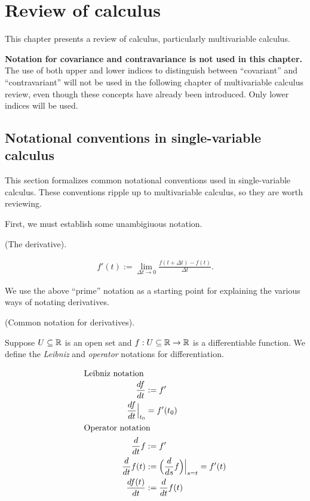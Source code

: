 \chapter{Review of calculus}
\label{ch::calc}

This chapter presents a review of calculus, particularly multivariable calculus.

\vspace{.5cm}

\textbf{Notation for covariance and contravariance is not used in this chapter.} The use of both upper and lower indices to distinguish between ``covariant'' and ``contravariant'' will not be used in the following chapter of multivariable calculus review, even though these concepts have already been introduced. Only lower indices will be used.

\section{Notational conventions in single-variable calculus}

This section formalizes common notational conventions used in single-variable calculus. These conventions ripple up to multivariable calculus, so they are worth reviewing.

First, we must establish some unambigiuous notation.

\begin{defn}
    (The derivative).
    
    \begin{align*}
        f'(t) := \lim_{\Delta t \rightarrow 0} \frac{f(t + \Delta t) - f(t)}{\Delta t}.
    \end{align*}
\end{defn}

We use the above ``prime'' notation as a starting point for explaining the various ways of notating derivatives.

\begin{defn}
\label{ch::calc::defn::common_deriv_notation}

    (Common notation for derivatives).
    
    Suppose $U \subseteq \mathbb{R}$ is an open set and $f:U \subseteq \mathbb{R} \rightarrow \mathbb{R}$ is a differentiable function. We define the \textit{Leibniz} and \textit{operator} notations for differentiation.
    
    \begin{center}
        \begin{align*}
            \intertext{Leibniz notation} \hspace{2cm}
            \frac{df}{dt} &:= f' \\
            \frac{df}{dt}\Big|_{t_0} &= f'(t_0) \\
            \intertext{Operator notation} \hspace{2cm}
            \frac{d}{dt}f &:= f' \\
            \frac{d}{dt} f(t) &:= \Big( \frac{d}{ds} f\Big)\Big|_{s = t} = f'(t) \\
            \frac{df(t)}{dt} &:= \frac{d}{dt}f(t)
        \end{align*}
    \end{center}
\end{defn}

